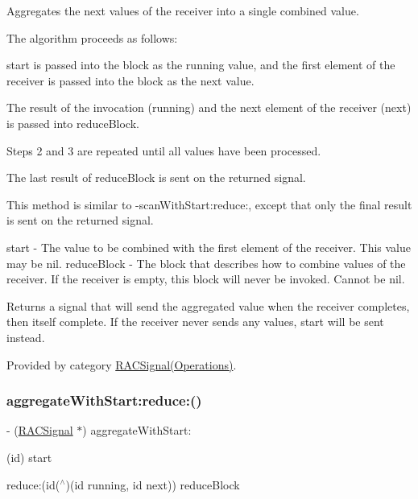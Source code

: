 Aggregates the {\ttfamily next} values of the receiver into a single combined value.

The algorithm proceeds as follows\+:


\begin{DoxyEnumerate}
\item {\ttfamily start} is passed into the block as the {\ttfamily running} value, and the first element of the receiver is passed into the block as the {\ttfamily next} value.
\item The result of the invocation ({\ttfamily running}) and the next element of the receiver ({\ttfamily next}) is passed into {\ttfamily reduce\+Block}.
\item Steps 2 and 3 are repeated until all values have been processed.
\item The last result of {\ttfamily reduce\+Block} is sent on the returned signal.
\end{DoxyEnumerate}

This method is similar to -\/scan\+With\+Start\+:reduce\+:, except that only the final result is sent on the returned signal.

start -\/ The value to be combined with the first element of the receiver. This value may be {\ttfamily nil}. reduce\+Block -\/ The block that describes how to combine values of the receiver. If the receiver is empty, this block will never be invoked. Cannot be nil.

Returns a signal that will send the aggregated value when the receiver completes, then itself complete. If the receiver never sends any values, {\ttfamily start} will be sent instead. 

Provided by category \mbox{\hyperlink{category_r_a_c_signal_07_operations_08_a4b872b6c2322aa37f98282043e768582}{R\+A\+C\+Signal(\+Operations)}}.

\mbox{\label{interface_r_a_c_signal_a4b872b6c2322aa37f98282043e768582}} 
\subsubsection{\texorpdfstring{aggregate\+With\+Start\+:reduce\+:()}{aggregateWithStart:reduce:()}\hspace{0.1cm}{\footnotesize\ttfamily [3/3]}}
{\footnotesize\ttfamily -\/ (\mbox{\hyperlink{interface_r_a_c_signal}{R\+A\+C\+Signal}} $\ast$) aggregate\+With\+Start\+: \begin{DoxyParamCaption}\item[{(id)}]{start }\item[{reduce:(id($^\wedge$)(id running, id next))}]{reduce\+Block }\end{DoxyParamCaption}}

